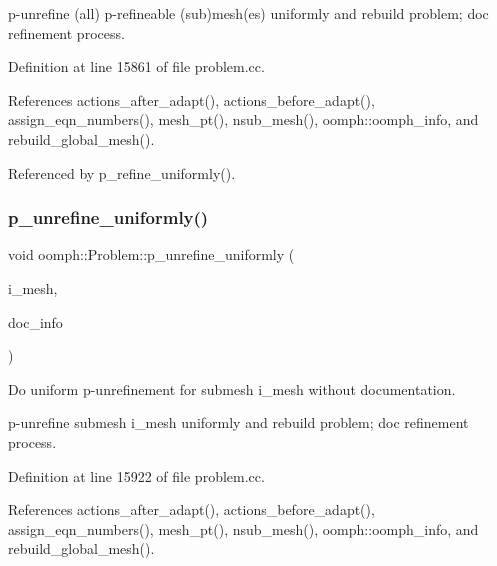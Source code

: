 p-\/unrefine (all) p-\/refineable (sub)mesh(es) uniformly and rebuild problem; doc refinement process. 

Definition at line 15861 of file problem.\+cc.



References actions\+\_\+after\+\_\+adapt(), actions\+\_\+before\+\_\+adapt(), assign\+\_\+eqn\+\_\+numbers(), mesh\+\_\+pt(), nsub\+\_\+mesh(), oomph\+::oomph\+\_\+info, and rebuild\+\_\+global\+\_\+mesh().



Referenced by p\+\_\+refine\+\_\+uniformly().

\mbox{\label{classoomph_1_1Problem_a706a2845212ece5535260cca6301653d}} 
\subsubsection{\texorpdfstring{p\+\_\+unrefine\+\_\+uniformly()}{p\_unrefine\_uniformly()}\hspace{0.1cm}{\footnotesize\ttfamily [2/2]}}
{\footnotesize\ttfamily void oomph\+::\+Problem\+::p\+\_\+unrefine\+\_\+uniformly (\begin{DoxyParamCaption}\item[{const unsigned \&}]{i\+\_\+mesh,  }\item[{\hyperlink{classoomph_1_1DocInfo}{Doc\+Info} \&}]{doc\+\_\+info }\end{DoxyParamCaption})}



Do uniform p-\/unrefinement for submesh i\+\_\+mesh without documentation. 

p-\/unrefine submesh i\+\_\+mesh uniformly and rebuild problem; doc refinement process. 

Definition at line 15922 of file problem.\+cc.



References actions\+\_\+after\+\_\+adapt(), actions\+\_\+before\+\_\+adapt(), assign\+\_\+eqn\+\_\+numbers(), mesh\+\_\+pt(), nsub\+\_\+mesh(), oomph\+::oomph\+\_\+info, and rebuild\+\_\+global\+\_\+mesh().

\mbox{\label{classoomph_1_1Problem_a0487a7ef40e6cc4dad88e99ac96193e2}} 
